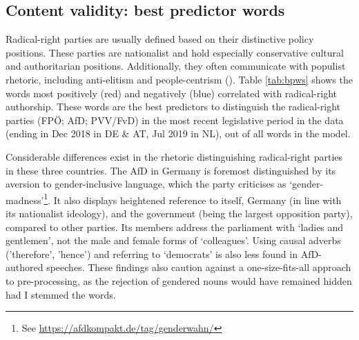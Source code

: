 \documentclass{article}
\begin{document}
\subsection{Content validity: best predictor words}

Radical-right parties are usually defined based on their distinctive policy positions. These parties are nationalist and hold especially conservative cultural and authoritarian positions. Additionally, they often communicate with populist rhetoric, including anti-elitism and people-centrism (\cite{Mudde2007}). Table \ref{tab:bpws} shows the words most positively (red) and negatively (blue) correlated with radical-right authorship. These words are the best predictors to distinguish the radical-right parties (FPÖ; AfD; PVV/FvD) in the most recent legislative period in the data (ending in Dec 2018 in DE \& AT, Jul 2019 in NL), out of all words in the model. \par

Considerable differences exist in the rhetoric distinguishing radical-right parties in these three countries. The AfD in Germany is foremost distinguished by its aversion to gender-inclusive language, which the party criticises as ‘gender-madness’\footnote{See \url{https://afdkompakt.de/tag/genderwahn/}}. It also displays heightened reference to itself, Germany (in line with its nationalist ideology), and the government (being the largest opposition party), compared to other parties. Its members address the parliament with ‘ladies and gentlemen’, not the male and female forms of ‘colleagues’. Using causal adverbs ('therefore', 'hence') and referring to ‘democrats’ is also less found in AfD-authored speeches. These findings also caution against a one-size-fits-all approach to pre-processing, as the rejection of gendered nouns would have remained hidden had I stemmed the words. \par
\end{document}
